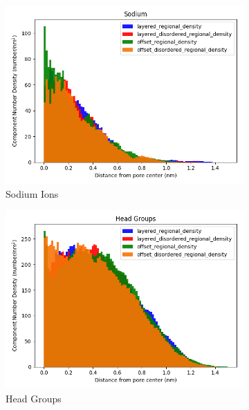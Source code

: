 \documentclass{article}
\begin{document}
  \begin{figure}
  \centering
  \begin{subfigure}{0.32\textwidth}
        \includegraphics[width=1\linewidth]{sodium_density.png}
        \caption{Sodium Ions}
        \label{fig:sodium_regional_density}
  \end{subfigure}
  \begin{subfigure}{0.32\textwidth}
        \includegraphics[width=1\linewidth]{head_group_density.png}
        \caption{Head Groups}
        \label{fig:head_groups_regional_density}
  \end{subfigure}
  \begin{subfigure}{0.32\textwidth}

\end{subfigure}
\end{figure}
\end{document}
